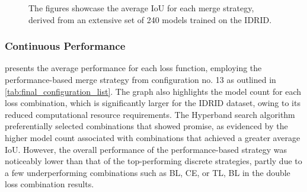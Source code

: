 \begin{figure}[H]%
  \centering
  \caption[Average IoU for Each Merge Strategy (IDRID)]{The figures showcase the average \ac{IoU} for each merge strategy, derived from an extensive set of 240 models trained on the \acf{IDRID}.}
  \label{discrete_merge_strategy_results_idrid_short}
\end{figure}

\subsubsection*{Continuous Performance}
 presents the average performance for each loss function, employing the performance-based merge strategy from configuration no. 13 as outlined in \ref{tab:final_configuration_list}. The graph also highlights the model count for each loss combination, which is significantly larger for the \ac{IDRID} dataset, owing to its reduced computational resource requirements. The Hyperband search algorithm preferentially selected combinations that showed promise, as evidenced by the higher model count associated with combinations that achieved a greater average \ac{IoU}. However, the overall performance of the performance-based strategy was noticeably lower than that of the top-performing discrete strategies, partly due to a few underperforming combinations such as BL, CE, or TL, BL in the double loss combination results.

